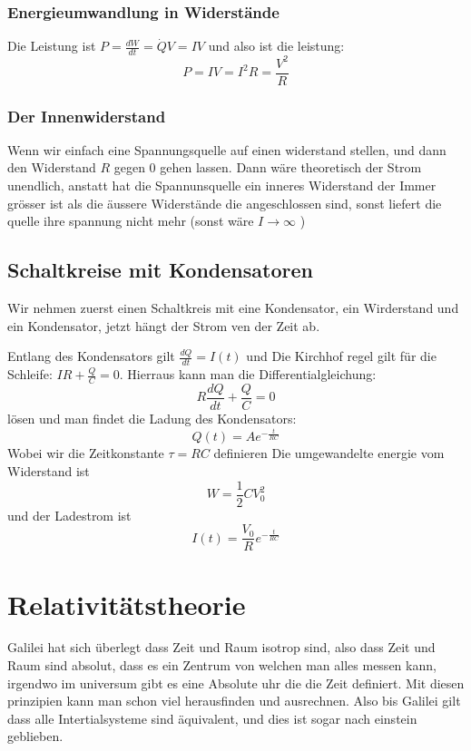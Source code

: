 \documentclass{article}
\begin{document}
\subsubsection{Energieumwandlung in Widerstände}
Die Leistung ist $P=\frac{dW}{dt}=\dot{Q}V=IV$ und also ist die leistung:\[P=IV=I^2R=\frac{V^2}{R}\]
\subsubsection{Der Innenwiderstand}
Wenn wir einfach eine Spannungsquelle auf einen widerstand stellen, und dann den Widerstand $R$ gegen $0$ gehen lassen. Dann wäre theoretisch der Strom unendlich, anstatt hat die Spannunsquelle ein inneres Widerstand der Immer grösser ist als die äussere Widerstände die angeschlossen sind, sonst liefert die quelle ihre spannung nicht mehr (sonst wäre $I\rightarrow \infty$ )
\subsection{Schaltkreise mit Kondensatoren}
\begin{multicols}{2}
Wir nehmen zuerst einen Schaltkreis mit eine Kondensator, ein Wirderstand und ein Kondensator, jetzt hängt der Strom ven der Zeit ab.\vfill\null\columnbreak
\begin{center}
\end{center}
\end{multicols}
Entlang des Kondensators gilt $\frac{dQ}{dt}=I(t)$ und Die Kirchhof regel gilt für die Schleife: $IR+\frac{Q}{C}=0$. Hierraus kann man die Differentialgleichung:
\[R\frac{dQ}{dt}+\frac{Q}{C}=0\] lösen und man findet die Ladung des Kondensators:
\[Q(t)=Ae^{-\frac{t}{RC}}\] Wobei wir die Zeitkonstante $\tau=RC$ definieren
Die umgewandelte energie vom Widerstand ist \[W=\frac{1}{2}CV_0^2\] und der Ladestrom ist \[I(t)=\frac{V_0}{R}e^{-\frac{t}{RC}}\]
\section{Relativitätstheorie}
Galilei hat sich überlegt dass Zeit und Raum isotrop sind, also dass Zeit und Raum sind absolut, dass es ein Zentrum von welchen man alles messen kann, irgendwo im universum gibt es eine Absolute uhr die die Zeit definiert. Mit diesen prinzipien kann
man schon viel herausfinden und ausrechnen. Also bis Galilei gilt dass alle Intertialsysteme sind äquivalent, und dies ist sogar nach einstein geblieben.
\end{document}

